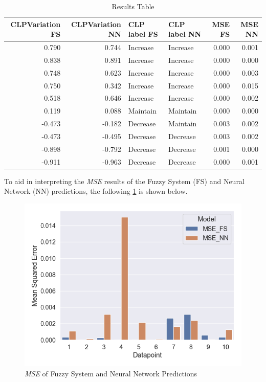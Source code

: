 \documentclass[titlepage]{article}
\begin{document}
\begin{table}[H]
    \centering
    \begin{tabular}{rrllrr}
        \toprule
        CLPVariation FS & CLPVariation NN & CLP label FS & CLP label NN & MSE FS & MSE NN \\
        \midrule
        0.790           & 0.744           & Increase     & Increase     & 0.000  & 0.001  \\
        0.838           & 0.891           & Increase     & Increase     & 0.000  & 0.000  \\
        0.748           & 0.623           & Increase     & Increase     & 0.000  & 0.003  \\
        0.750           & 0.342           & Increase     & Increase     & 0.000  & 0.015  \\
        0.518           & 0.646           & Increase     & Increase     & 0.000  & 0.002  \\
        0.119           & 0.088           & Maintain     & Maintain     & 0.000  & 0.000  \\
        -0.473          & -0.182          & Decrease     & Maintain     & 0.003  & 0.002  \\
        -0.473          & -0.495          & Decrease     & Decrease     & 0.003  & 0.002  \\
        -0.898          & -0.792          & Decrease     & Decrease     & 0.001  & 0.000  \\
        -0.911          & -0.963          & Decrease     & Decrease     & 0.000  & 0.001  \\
        \bottomrule
    \end{tabular}
    \caption{Results Table}
    \label{tab:final_results}
\end{table}

To aid in interpreting the \emph{MSE} results of the Fuzzy System (FS) and Neural Network (NN) predictions, the following \cref{fig:mse_fs_nn} is shown below.

\begin{figure}[H]
    \centering
    \includegraphics[scale=0.5]{../images/final_results/mse}
    \caption{\emph{MSE} of Fuzzy System and Neural Network Predictions}
    \label{fig:mse_fs_nn}
\end{figure}
\end{document}
